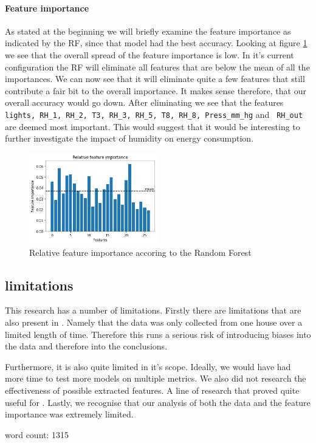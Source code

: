 \documentclass[british]{article}
\newcommand{\code}[1]{\texttt{#1}}
\begin{document}
	\paragraph{Feature importance} As stated at the beginning we will briefly examine the feature importance as indicated by the RF, since that model had the best accuracy. Looking at figure \ref{relImp} we see that the overall spread of the feature importance is low. In it's current configuration the RF will eliminate all features that are below the mean of all the importances. We can now see that it will eliminate quite a few features that still contribute a fair bit to the overall importance. It makes sense therefore, that our overall accuracy would go down. After eliminating we see that the features \code{lights, RH\_1, RH\_2, T3, RH\_3, RH\_5, T8, RH\_8, Press\_mm\_hg} and \code{ RH\_out} are deemed most important. This would suggest that it would be interesting to further investigate the impact of humidity on energy consumption. 
	
	\begin{figure}[!ht]
		\centering
		\includegraphics[width=0.5\textwidth]{relFeatureImp}
		\caption{Relative feature importance accoring to the Random Forest}
		\label{relImp}
	\end{figure}
	
	
	\subsection{limitations} This research has a number of limitations. Firstly there are limitations that are also present in \autocite{Candanedo2017}. Namely that the data was only collected from one house over a limited length of time. Therefore this runs a serious risk of introducing biases into the data and therefore into the conclusions. 
	
	Furthermore, it is also quite limited in it's scope. Ideally, we would have had more time to test more models on multiple metrics. We also did not research the effectiveness of possible extracted features. A line of research that proved quite useful for \citeauthor{Candanedo2017}. Lastly, we recognise that our analysis of both the data and the feature importance was extremely limited. 
	
	
	
	word count: 1315
	\printbibliography
\end{document}
